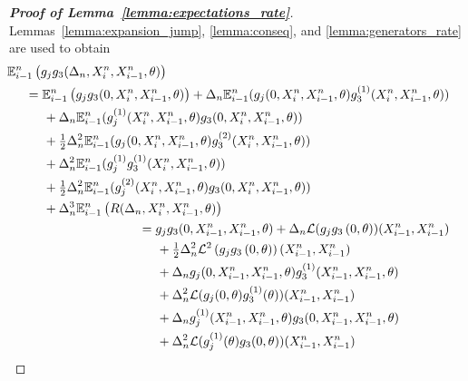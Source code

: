 \documentclass[11pt,a4paper]{article}
\newcommand{\xtl}{{X^n_{i-1}}}
\newcommand{\xtr}{X^n_i}
\newcommand{\EE}{{\mathbb E}}
\renewcommand{\ll}{{\mathcal{L}}}
\numberwithin{equation}{section}
\numberwithin{theorem}{section}
\begin{document}
\begin{proof}[\textbf{Proof of Lemma~\ref{lemma:expectations_rate}}]
Lemmas~\ref{lemma:expansion_jump}, \ref{lemma:conseq}, and
\ref{lemma:generators_rate} are used to obtain
\begin{align*}
\begin{split}
&\hspace{-5mm} \EE^n_{i-1}\left( g_{j}g_{3}(\Delta_n,\xtr,\xtl,
  \theta)\right)\\
&= \EE^n_{i-1}\left( g_{j}g_{3}(0,\xtr,\xtl, \theta) \right) + \Delta_n  \EE^n_{i-1}( g_{j}(0,\xtr,\xtl,
\theta)g_{3}^{(1)}(\xtr,\xtl, \theta) ) \\
&\hspace{5mm} + \Delta_n\EE^n_{i-1}( g_{j}^{(1)}(\xtr,\xtl,
\theta)g_{3}(0,\xtr,\xtl, \theta)) \\
&\hspace{5mm} + \tfrac{1}{2}\Delta_n^2 \EE^n_{i-1}(
  g_{j}(0,\xtr,\xtl, \theta)g_{3}^{(2)}(\xtr,\xtl, \theta)) \\
&\hspace{5mm} + \Delta_n^2 \EE^n_{i-1}(
  g_{j}^{(1)}g_{3}^{(1)}(\xtr,\xtl, \theta) ) \\
&\hspace{5mm} + \tfrac{1}{2}\Delta_n^2 \EE^n_{i-1}(
  g_{j}^{(2)}(\xtr,\xtl, \theta)g_{3}(0,\xtr,\xtl, \theta) ) \\
&\hspace{5mm} + \Delta_n^3 \EE^n_{i-1}\left( R(\Delta_n,\xtr,\xtl, \theta) \right) \end{split}\\
\begin{split}
&= g_{j}g_{3}(0,\xtl,\xtl,
  \theta) + \Delta_n \ll( g_{j}g_{3}\left(0,
      \theta\right))(\xtl,\xtl)\\
&\hspace{5mm} + \tfrac{1}{2}\Delta_n^2 \ll^2\left( g_{j}g_{3}\left(0,
      \theta\right)\right)(\xtl,\xtl) \\
&\hspace{5mm} +  \Delta_ng_{j}(0,\xtl,\xtl,
\theta)g_{3}^{(1)}(\xtl,\xtl, \theta) \\
&\hspace{5mm} + \Delta_n^2 \ll( g_{j}(0,
\theta)g_{3}^{(1)}(\theta))(\xtl,\xtl) \\
&\hspace{5mm} +\Delta_n g_{j}^{(1)}(\xtl,\xtl,
\theta)g_{3}(0,\xtl,\xtl, \theta) \\
&\hspace{5mm} + \Delta_n^2 \ll( g_{j}^{(1)}(
\theta)g_{3}(0, \theta))(\xtl,\xtl) \\

\end{split}
\end{align*}
\end{proof}
\end{document}
